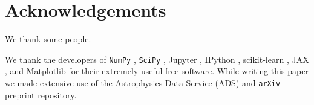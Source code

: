 \documentclass[numberedappendix,twocolumn,twocolappendix]{openjournal}
\begin{document}
\section*{Acknowledgements}
We thank some people.

We thank the developers of {\tt NumPy} \citep{numpy_ndarray}, {\tt SciPy} \citep{scipy}, Jupyter \citep{jupyter}, IPython \citep{ipython}, scikit-learn \citep{scikit_learn}, JAX \citep{jax2018github}, and Matplotlib \citep{matplotlib} for their extremely useful free software. While writing this paper we made extensive use of the Astrophysics Data Service (ADS) and {\tt arXiv} preprint repository.




\appendix

\end{document}
